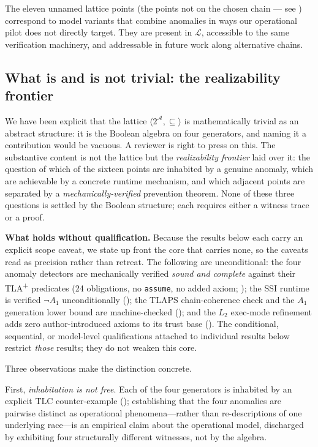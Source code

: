 \documentclass[journal,compsoc,10pt]{IEEEtran}
\theoremstyle{definition}
\theoremstyle{remark}
\begin{document}
The eleven unnamed lattice points (the points not on the chosen
chain --- see ) correspond to model variants
that combine anomalies in ways our operational pilot does not
directly target. They are present in $\mathcal{L}$, accessible
to the same verification machinery, and addressable in future
work along alternative chains.

\subsection{What is and is not trivial: the realizability frontier}
\label{sec:realisability}
We have been explicit that the lattice $\langle 2^{\mathcal{A}},
\subseteq \rangle$ is mathematically trivial as an abstract
structure: it is the Boolean algebra on four generators, and
naming it a contribution would be vacuous. A reviewer is right
to press on this. The substantive content is not the lattice
but the \emph{realizability frontier} laid over it: the
question of which of the sixteen points are inhabited by a
genuine anomaly, which are achievable by a concrete runtime
mechanism, and which adjacent points are separated by a
\emph{mechanically-verified} prevention theorem. None of these
three questions is settled by the Boolean structure; each
requires either a witness trace or a proof.

\medskip
\noindent\textbf{What holds without qualification.} Because the results
below each carry an explicit scope caveat, we state up front the core that
carries none, so the caveats read as precision rather than retreat. The
following are unconditional: the four anomaly detectors are mechanically
verified \emph{sound and complete} against their TLA\textsuperscript{+}
predicates (24 obligations, no \texttt{assume}, no added axiom;
); the SSI runtime is verified $\neg A_1$
unconditionally (); the TLAPS chain-coherence check
and the $A_1$ generation lower bound are machine-checked
(); and the $L_2$ exec-mode refinement adds zero
author-introduced axioms to its trust base (). The
conditional, sequential, or model-level qualifications attached to
individual results below restrict \emph{those} results; they do not weaken
this core.

Three observations make the distinction concrete.

First, \emph{inhabitation is not free}. Each of the four
generators is inhabited by an explicit TLC counter-example
(); establishing that the four anomalies
are pairwise distinct as operational phenomena---rather than
re-descriptions of one underlying race---is an empirical claim
about the operational model, discharged by exhibiting four
structurally different witnesses, not by the algebra.
\end{document}

